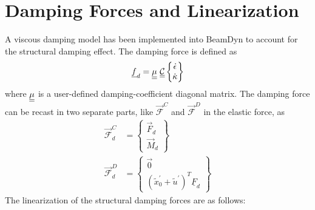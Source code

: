 \section{Damping Forces and Linearization}
A viscous damping model has been implemented into BeamDyn to account for the structural damping effect. The damping force is defined as 
\begin{equation}
   \label{Damping}
   \underline{f}_d = \underline{\underline{\mu}}~ \underline{\underline{\mathcal{C}}} \begin{Bmatrix}
   \dot{\epsilon} \\
   \dot{\kappa}
   \end{Bmatrix}
\end{equation}
where $ \underline{\underline{\mu}}$ is a user-defined damping-coefficient diagonal matrix. The damping force can be recast in two separate parts, like $\vec{\mathcal{F}}^C$ and $\vec{\mathcal{F}}^D$ in the elastic force, as
\begin{align}
   \label{DampingForce-1}
   \vec{\mathcal{F}}^C_d &= \begin{Bmatrix}
   \vec{F}_d \\
   \vec{M}_d
   \end{Bmatrix} \\
   \label{DampingForce-2}
   \vec{\mathcal{F}}^D_d &= \begin{Bmatrix}
    \vec{0} \\
    (\tilde{x}^\prime_0 + \tilde{u}^\prime)^T \underline{F}_d
    \end{Bmatrix}   
\end{align}
The linearization of the structural damping forces are as follows:
